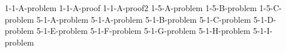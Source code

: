 \documentclass[uplatex, dvipdfmx, a4paper, 12pt, class=jsarticle, crop=false]{standalone}
\begin{document}
	{1-1-A-problem}
	{1-1-A-proof}
	{1-1-A-proof2}
	{1-5-A-problem}
	{1-5-B-problem}
	{1-5-C-problem}
	{5-1-A-problem}
	{5-1-A-problem}
	{5-1-B-problem}
	{5-1-C-problem}
	{5-1-D-problem}
	{5-1-E-problem}
	{5-1-F-problem}
	{5-1-G-problem}
	{5-1-H-problem}
	{5-1-I-problem}
\end{document}
